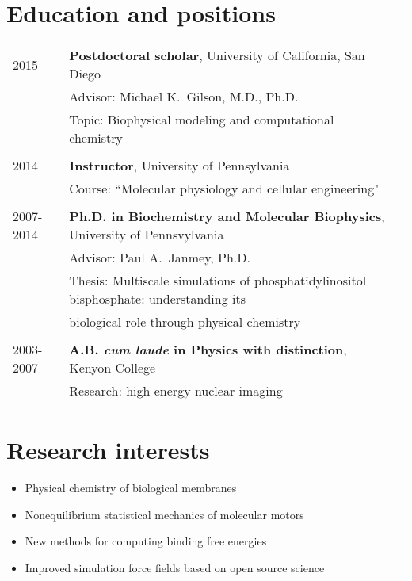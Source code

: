 \documentclass[letterpaper,11pt]{article}
\begin{document}
\maketitle
 
\section{Education and positions}
\begin{tabular}{lll}
2015- & \textbf{Postdoctoral scholar}, University of California, San Diego\\
             & Advisor: Michael K.~Gilson, M.D., Ph.D.\\
             & Topic: Biophysical modeling and computational chemistry \\
             \\
2014         & \textbf{Instructor}, University of Pennsylvania \\
             & Course: ``Molecular physiology and cellular engineering"\\
             \\
2007-2014 & \textbf{Ph.D. in Biochemistry and Molecular Biophysics}, University of Pennsvylvania \\
          & Advisor: Paul A.~Janmey, Ph.D. \\ 
          & Thesis: 
Multiscale simulations of phosphatidylinositol bisphosphate: understanding its \\ & biological role through physical chemistry \\
\\
2003-2007 & \textbf{A.B. \textit{cum laude} in Physics with distinction}, Kenyon College \\
          & Research: high energy nuclear imaging
\end{tabular}

\section{Research interests}
\begin{itemize}
    \item Physical chemistry of biological membranes
    \item Nonequilibrium statistical mechanics of molecular motors
    \item New methods for computing binding free energies
    \item Improved simulation force fields based on open source science
\end{itemize}
\end{document}
